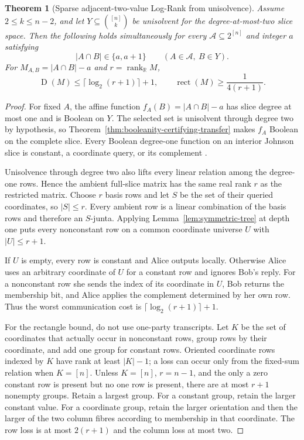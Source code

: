 \documentclass[11pt]{article}
\newtheorem{theorem}{Theorem}[section]
\theoremstyle{definition}
\theoremstyle{remark}
\newcommand{\cA}{\mathcal A}
\newcommand{\R}{\mathbb R}
\newcommand{\1}{\mathbf 1}
\newcommand{\rank}{\operatorname{rank}}
\newcommand{\rect}{\operatorname{rect}}
\newcommand{\Dcc}{\operatorname{D}}
\begin{document}
\begin{theorem}[Sparse adjacent-two-value Log-Rank from unisolvence]
\label{thm:quadratic-column-hls}
Assume $2\le k\le n-2$, and let $Y\subseteq\binom{[n]}k$ be unisolvent for
the degree-at-most-two slice space.  Then the following holds simultaneously
for every $\cA\subseteq2^{[n]}$ and integer $a$ satisfying
\[
 |A\cap B|\in\{a,a+1\}
 \qquad(A\in\cA,\ B\in Y).
\]
For $M_{A,B}=|A\cap B|-a$ and $r=\rank_{\R}M$,
\[
 \Dcc(M)\le\lceil\log_2(r+1)\rceil+1,
 \qquad
 \rect(M)\ge\frac1{4(r+1)}.
\]
\end{theorem}

\begin{proof}
For fixed $A$, the affine function $f_A(B)=|A\cap B|-a$ has slice degree at
most one and is Boolean on $Y$.  The selected set is unisolvent through
degree two by hypothesis, so Theorem~\ref{thm:booleanity-certifying-transfer} makes $f_A$
Boolean on the complete slice.  Every Boolean degree-one function on an
interior Johnson slice is constant, a coordinate query, or its complement
\cite{FilmusIhringer}.

Unisolvence through degree two also lifts every linear relation among the
degree-one rows.  Hence the ambient full-slice matrix has the same real rank
$r$ as the restricted matrix.  Choose $r$ basis rows and let $S$ be the set
of their queried coordinates, so $|S|\le r$.  Every ambient row is a linear
combination of the basis rows and therefore an $S$-junta.  Applying
Lemma~\ref{lem:symmetric-tree} at depth one puts every nonconstant row on a
common coordinate universe $U$ with $|U|\le r+1$.

If $U$ is empty, every row is constant and Alice outputs locally.  Otherwise
Alice uses an arbitrary coordinate of $U$ for a constant row and ignores
Bob's reply.  For a nonconstant row she sends the index of its coordinate in
$U$, Bob returns the membership bit, and Alice applies the complement
determined by her own row.  Thus the worst communication cost is
$\lceil\log_2(r+1)\rceil+1$.

For the rectangle bound, do not use one-party transcripts.  Let $K$ be the
set of coordinates that actually occur in nonconstant rows, group rows by
their coordinate, and add one group for constant rows.  Oriented coordinate
rows indexed by $K$ have rank at least $|K|-1$; a loss can occur only from
the fixed-sum relation when $K=[n]$.  Unless $K=[n]$, $r=n-1$, and the only
a zero constant row is present but no one row is present, there are at most
$r+1$ nonempty groups.
Retain a largest group.  For a constant group, retain the larger constant
value.  For a coordinate group, retain the larger orientation and then the
larger of the two column fibres according to membership in that coordinate.
The row loss is at most $2(r+1)$ and the column loss at most two.


\end{proof}
\end{document}
